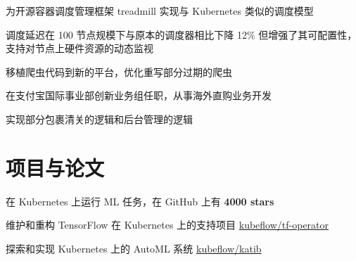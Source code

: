 \documentclass[]{deedy-resume-openfont}
\begin{document}
\begin{minipage}[t]{0.68\textwidth}
\begin{tightemize}
\item 为开源容器调度管理框架 treadmill 实现与 Kubernetes 类似的调度模型
\item 调度延迟在 100 节点规模下与原本的调度器相比下降 12\% 但增强了其可配置性，支持对节点上硬件资源的动态监视
\end{tightemize}
\sectionsep

\begin{tightemize}
\item 移植爬虫代码到新的平台，优化重写部分过期的爬虫
\end{tightemize}
\sectionsep

\begin{tightemize}
\item 在支付宝国际事业部创新业务组任职，从事海外直购业务开发
\item 实现部分包裹清关的逻辑和后台管理的逻辑
\end{tightemize}
\sectionsep


\section{项目与论文}
\sectionsep

\begin{tightemize}
    \item 在 Kubernetes 上运行 ML 任务，在 GitHub 上有 \textbf{4000 stars}
    \item 维护和重构 TensorFlow 在 Kubernetes 上的支持项目 \href{https://github.com/kubeflow/tf-operator}{kubeflow/tf-operator}
    \item 探索和实现 Kubernetes 上的 AutoML 系统 \href{https://github.com/kubeflow/katib}{kubeflow/katib}
    \end{tightemize}
\sectionsep


% 
% 

\end{minipage}
\end{document}

